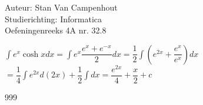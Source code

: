\documentclass[a4paper]{article}
\begin{document}
  
\noindent \large Auteur: Stan Van Campenhout \\
\noindent \large Studierichting:  Informatica\\
\noindent \large Oefeningenreeks 4A nr. 32.8\\

\medskip

\normalsize

$ \displaystyle\int e^x\cosh xdx = \displaystyle\int e^x\dfrac{e^x+e^{-x}}{2}dx = \dfrac{1}{2}\displaystyle\int\left( e^{2x} + \dfrac{e^x}{e^x}\right)dx $\\

$ = \dfrac{1}{4}\displaystyle\int e^{2x}d\left(2x\right) + \dfrac{1}{2}\displaystyle\int dx = \dfrac{e^{2x}}{4} + \dfrac{x}{2} + c $\\

\begin{thebibliography}{999}
\end{thebibliography}
\end{document}
